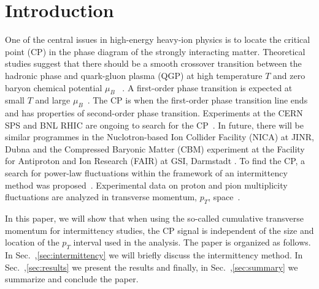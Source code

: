 \documentclass[floatfix,superscriptaddress,a4paper,
               nofootinbib,preprint]{revtex4}
\begin{document}
\section{Introduction}
\label{sec:introduction}

One of the central issues in high-energy heavy-ion physics is to locate the critical point (CP) in the phase diagram of the strongly interacting matter. Theoretical studies suggest that there should be a smooth crossover transition between the hadronic phase and quark-gluon plasma (QGP) at high temperature $T$ and zero baryon chemical potential $\mu_B$ ~\cite{Aoki:2006we}. A first-order phase transition is expected at small $T$ and large $\mu_B$~\cite{Asakawa:1989bq}. The CP is when the first-order phase transition line ends and has properties of second-order phase transition. Experiments at the CERN SPS and BNL RHIC are ongoing to search for the CP~\cite{Davis:2019mlt, STAR:2020tga, Luo:2017faz}. In future, there will be similar programmes in the Nuclotron-based Ion Collider Facility (NICA) at JINR, Dubna and the Compressed Baryonic
Matter (CBM) experiment at the Facility for Antiproton and Ion Research (FAIR) at GSI, Darmstadt \cite{Ablyazimov:2017guv}.
To find the CP, a search for power-law fluctuations within the framework of an intermittency method was proposed~\cite{Bialas:1985jb, Bialas:1988wc, Satz:1989vj, Gupta:1990bi}. 
Experimental data on proton and pion multiplicity fluctuations are analyzed in transverse
momentum, $p_T$, space~\cite{Anticic:2012xb,Anticic:2009pe,Davis:2020fcy}.

In this paper, we will show that when using the so-called cumulative transverse momentum for intermittency studies, the CP signal is independent of the size and location of the $p_T$ interval used in the analysis.
The paper is organized as follows. In Sec.~,\ref{sec:intermittency} we will briefly discuss the intermittency method. In Sec.~,\ref{sec:results} we present the results and finally, in Sec.~,\ref{sec:summary} we summarize and conclude the paper.
\end{document}
